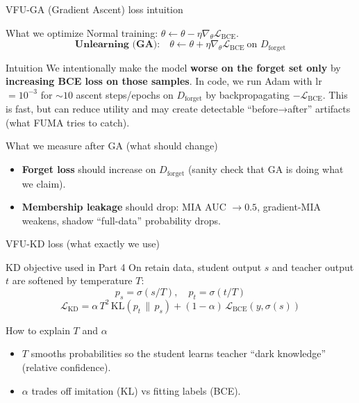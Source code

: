 \documentclass[aspectratio=169, 11pt]{beamer}
\begin{document}
\begin{frame}{VFU-GA (Gradient Ascent) loss intuition}
  \begin{block}{What we optimize}
    Normal training: \(\theta \leftarrow \theta - \eta \nabla_\theta \mathcal{L}_{\text{BCE}}\).
    \vspace{0.2em}
    \[
      \textbf{Unlearning (GA):}\quad \theta \leftarrow \theta + \eta \nabla_\theta \mathcal{L}_{\text{BCE}} \ \text{on } D_{\text{forget}}
    \]
  \end{block}
  \vspace{0.6em}
  \begin{alertblock}{Intuition}
    We intentionally make the model \textbf{worse on the forget set only} by \textbf{increasing BCE loss on those samples}.
    In code, we run Adam with lr \(=10^{-3}\) for \(\sim 10\) ascent steps/epochs on \(D_{\text{forget}}\) by backpropagating \(-\mathcal{L}_{\text{BCE}}\).
    This is fast, but can reduce utility and may create detectable ``before→after'' artifacts (what FUMA tries to catch).
  \end{alertblock}
  \vspace{0.3em}
  \begin{exampleblock}{What we measure after GA (what should change)}
    \small
    \begin{itemize}
      \item \textbf{Forget loss} should increase on \(D_{\text{forget}}\) (sanity check that GA is doing what we claim).
      \item \textbf{Membership leakage} should drop: MIA AUC \(\rightarrow 0.5\), gradient-MIA weakens, shadow ``full-data'' probability drops.
    \end{itemize}
  \end{exampleblock}
\end{frame}

\begin{frame}{VFU-KD loss (what exactly we use)}
  \begin{block}{KD objective used in Part 4}
    On retain data, student output \(s\) and teacher output \(t\) are softened by temperature \(T\):
    \[
      p_s = \sigma(s/T),\quad p_t = \sigma(t/T)
    \]
    \[
      \mathcal{L}_{\text{KD}} = \alpha\, T^2\, \mathrm{KL}(p_t \,\|\, p_s) + (1-\alpha)\, \mathcal{L}_{\text{BCE}}(y, \sigma(s))
    \]
  \end{block}
  \vspace{0.5em}
  \begin{exampleblock}{How to explain \(T\) and \(\alpha\)}
    \begin{itemize}
      \item \(T\) smooths probabilities so the student learns teacher ``dark knowledge'' (relative confidence).
      \item \(\alpha\) trades off imitation (KL) vs fitting labels (BCE).
    \end{itemize}
  \end{exampleblock}
\end{frame}
\end{document}
